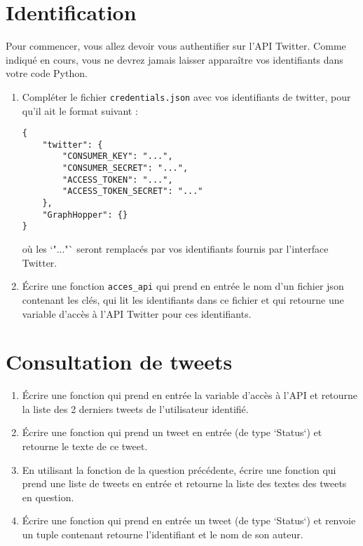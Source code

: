 \documentclass[11pt,a4paper]{article}
\begin{document}
\section{Identification}

Pour commencer, vous allez devoir vous authentifier sur l'API Twitter. Comme indiqué en cours, vous ne devrez jamais laisser apparaître vos identifiants dans votre code Python.

\begin{enumerate}
    \item Compléter le fichier \verb+credentials.json+ avec vos identifiants de twitter, pour qu'il ait le format suivant : 
\begin{verbatim}
{
    "twitter": {
        "CONSUMER_KEY": "...",
        "CONSUMER_SECRET": "...",
        "ACCESS_TOKEN": "...",
        "ACCESS_TOKEN_SECRET": "..."
    },
    "GraphHopper": {}
}

\end{verbatim}
où les `"..."` seront remplacés par vos identifiants fournis par l'interface Twitter.
\item Écrire une fonction \verb+acces_api+ qui prend en entrée le nom d'un fichier json contenant les clés, qui lit les identifiants dans ce fichier et qui retourne une variable d'accès à l'API Twitter pour ces identifiants.
\end{enumerate}

\section{Consultation de tweets}
\begin{enumerate}
    
    
\item  Écrire une fonction qui prend en entrée la variable d'accès à l'API et retourne la liste des 2 derniers tweets de l'utilisateur identifié.

\item Écrire une fonction qui prend un tweet en entrée (de type `Status`) et retourne le texte de ce tweet.

\item En utilisant la fonction de la question précédente, écrire une fonction qui prend une liste de tweets en entrée et retourne la liste des textes des tweets en question.

\item Écrire une fonction qui prend en entrée un tweet (de type `Status`) et renvoie un tuple contenant retourne l'identifiant et le nom de son auteur.

\end{enumerate}
\end{document}
